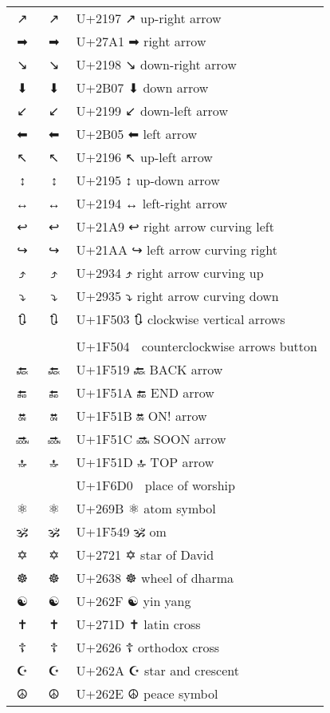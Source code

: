 \documentclass[a4paper,12pt]{article}
\newcommand{\fontA}[1]{{\fontspec[RawFeature={mode=harf,+dist,+ccmp}]{Segoe UI Emoji} #1}}
\newcommand{\fontB}[1]{{\fontspec[RawFeature={mode=harf,+dist,+ccmp}]{Noto Color Emoji} #1}}
\begin{document}
\begin{longtable}[c]{ccp{0.8\linewidth}}
\fontA{↗}&\fontB{↗}&U+2197 ↗ up-right arrow\\
\fontA{➡}&\fontB{➡}&U+27A1 ➡ right arrow\\
\fontA{↘}&\fontB{↘}&U+2198 ↘ down-right arrow\\
\fontA{⬇}&\fontB{⬇}&U+2B07 ⬇ down arrow\\
\fontA{↙}&\fontB{↙}&U+2199 ↙ down-left arrow\\
\fontA{⬅}&\fontB{⬅}&U+2B05 ⬅ left arrow\\
\fontA{↖}&\fontB{↖}&U+2196 ↖ up-left arrow\\
\fontA{↕}&\fontB{↕}&U+2195 ↕ up-down arrow\\
\fontA{↔}&\fontB{↔}&U+2194 ↔ left-right arrow\\
\fontA{↩}&\fontB{↩}&U+21A9 ↩ right arrow curving left\\
\fontA{↪}&\fontB{↪}&U+21AA ↪ left arrow curving right\\
\fontA{⤴}&\fontB{⤴}&U+2934 ⤴ right arrow curving up\\
\fontA{⤵}&\fontB{⤵}&U+2935 ⤵ right arrow curving down\\
\fontA{🔃}&\fontB{🔃}&U+1F503 🔃 clockwise vertical arrows\\
\fontA{🔄}&\fontB{🔄}&U+1F504 🔄 counterclockwise arrows button\\
\fontA{🔙}&\fontB{🔙}&U+1F519 🔙 BACK arrow\\
\fontA{🔚}&\fontB{🔚}&U+1F51A 🔚 END arrow\\
\fontA{🔛}&\fontB{🔛}&U+1F51B 🔛 ON! arrow\\
\fontA{🔜}&\fontB{🔜}&U+1F51C 🔜 SOON arrow\\
\fontA{🔝}&\fontB{🔝}&U+1F51D 🔝 TOP arrow\\
\fontA{🛐}&\fontB{🛐}&U+1F6D0 🛐 place of worship\\
\fontA{⚛}&\fontB{⚛}&U+269B ⚛ atom symbol\\
\fontA{🕉}&\fontB{🕉}&U+1F549 🕉 om\\
\fontA{✡}&\fontB{✡}&U+2721 ✡ star of David\\
\fontA{☸}&\fontB{☸}&U+2638 ☸ wheel of dharma\\
\fontA{☯}&\fontB{☯}&U+262F ☯ yin yang\\
\fontA{✝}&\fontB{✝}&U+271D ✝ latin cross\\
\fontA{☦}&\fontB{☦}&U+2626 ☦ orthodox cross\\
\fontA{☪}&\fontB{☪}&U+262A ☪ star and crescent\\
\fontA{☮}&\fontB{☮}&U+262E ☮ peace symbol\\

\end{longtable}
\end{document}
